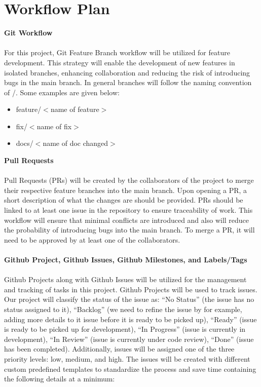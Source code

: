 \documentclass{article}
\begin{document}
\section{Workflow Plan}
\textbf{Git Workflow}\\
\\
For this project, Git Feature Branch workflow will be utilized for
feature development. This strategy will enable
the development of new features in isolated branches, enhancing
collaboration and reducing the risk of
introducing bugs in the main branch. In general branches will follow
the naming convention of /. Some
examples are given below:
\begin{itemize}
  \item feature/$<$name of feature$>$
  \item fix/$<$name of fix$>$
  \item docs/$<$name of doc changed$>$
\end{itemize}
\textbf{Pull Requests}\\
\\
Pull Requests (PRs) will be created by the collaborators of the
project to merge their respective feature
branches into the main branch. Upon opening a PR, a short description
of what the changes are should be
provided. PRs should be linked to at least one issue in the
repository to ensure traceability of work. This
workflow will ensure that minimal conflicts are introduced and also
will reduce the probability of introducing
bugs into the main branch. To merge a PR, it will need to be approved
by at least one of the collaborators.\\
\\
\textbf{Github Project, Github Issues, Github Milestones, and Labels/Tags}\\
\\
Github Projects along with Github Issues will be utilized for the
management and tracking of tasks in this
project. Github Projects will be used to track issues. Our project
will classify the status of the issue as: ``No
Status'' (the issue has no status assigned to it), ``Backlog'' (we need
  to refine the issue by for example, adding
more details to it issue before it is ready to be picked up), ``Ready''
(issue is ready to be picked up for
development), ``In Progress'' (issue is currently in development), ``In
Review'' (issue is currently under code
review), ``Done'' (issue has been completed). Additionally, issues will
be assigned one of the three priority
levels: low, medium, and high. The issues will be created with
different custom predefined templates to
standardize the process and save time containing the following
details at a minimum:
\end{document}
